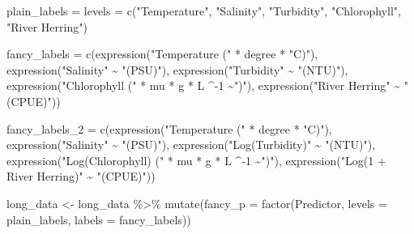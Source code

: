 \documentclass[
]{article}
\newenvironment{Shaded}{\begin{snugshade}}{\end{snugshade}}
\newcommand{\AttributeTok}[1]{\textcolor[rgb]{0.77,0.63,0.00}{#1}}
\newcommand{\DecValTok}[1]{\textcolor[rgb]{0.00,0.00,0.81}{#1}}
\newcommand{\FunctionTok}[1]{\textcolor[rgb]{0.00,0.00,0.00}{#1}}
\newcommand{\NormalTok}[1]{#1}
\newcommand{\OtherTok}[1]{\textcolor[rgb]{0.56,0.35,0.01}{#1}}
\newcommand{\SpecialCharTok}[1]{\textcolor[rgb]{0.00,0.00,0.00}{#1}}
\newcommand{\StringTok}[1]{\textcolor[rgb]{0.31,0.60,0.02}{#1}}
\begin{document}
\begin{Shaded}
\begin{Highlighting}[]
\NormalTok{plain\_labels }\OtherTok{=}\NormalTok{ levels }\OtherTok{=} \FunctionTok{c}\NormalTok{(}\StringTok{"Temperature"}\NormalTok{,}
                          \StringTok{"Salinity"}\NormalTok{, }
                          \StringTok{"Turbidity"}\NormalTok{,}
                          \StringTok{"Chlorophyll"}\NormalTok{, }
                          \StringTok{"River Herring"}\NormalTok{)}

\NormalTok{fancy\_labels }\OtherTok{=}  \FunctionTok{c}\NormalTok{(}\FunctionTok{expression}\NormalTok{(}\StringTok{"Temperature ("} \SpecialCharTok{*}\NormalTok{ degree }\SpecialCharTok{*} \StringTok{"C)"}\NormalTok{),}
                  \FunctionTok{expression}\NormalTok{(}\StringTok{"Salinity"} \SpecialCharTok{\textasciitilde{}} \StringTok{"(PSU)"}\NormalTok{),}
                  \FunctionTok{expression}\NormalTok{(}\StringTok{"Turbidity"} \SpecialCharTok{\textasciitilde{}} \StringTok{"(NTU)"}\NormalTok{),}
                  \FunctionTok{expression}\NormalTok{(}\StringTok{"Chlorophyll ("} \SpecialCharTok{*}\NormalTok{ mu }\SpecialCharTok{*}\NormalTok{ g }\SpecialCharTok{*}\NormalTok{ L }\SpecialCharTok{\^{}{-}}\DecValTok{1} \SpecialCharTok{\textasciitilde{}}\StringTok{")"}\NormalTok{), }
                  \FunctionTok{expression}\NormalTok{(}\StringTok{"River Herring"} \SpecialCharTok{\textasciitilde{}}  \StringTok{"(CPUE)"}\NormalTok{))}

\NormalTok{fancy\_labels\_2 }\OtherTok{=}  \FunctionTok{c}\NormalTok{(}\FunctionTok{expression}\NormalTok{(}\StringTok{"Temperature ("} \SpecialCharTok{*}\NormalTok{ degree }\SpecialCharTok{*} \StringTok{"C)"}\NormalTok{),}
                    \FunctionTok{expression}\NormalTok{(}\StringTok{"Salinity"} \SpecialCharTok{\textasciitilde{}} \StringTok{"(PSU)"}\NormalTok{),}
                    \FunctionTok{expression}\NormalTok{(}\StringTok{"Log(Turbidity)"} \SpecialCharTok{\textasciitilde{}} \StringTok{"(NTU)"}\NormalTok{),}
                    \FunctionTok{expression}\NormalTok{(}\StringTok{"Log(Chlorophyll) ("} \SpecialCharTok{*}\NormalTok{ mu }\SpecialCharTok{*}\NormalTok{ g }\SpecialCharTok{*}\NormalTok{ L }\SpecialCharTok{\^{}{-}}\DecValTok{1} \SpecialCharTok{\textasciitilde{}}\StringTok{")"}\NormalTok{), }
                    \FunctionTok{expression}\NormalTok{(}\StringTok{"Log(1 + River Herring)"} \SpecialCharTok{\textasciitilde{}}  \StringTok{"(CPUE)"}\NormalTok{))}

\NormalTok{long\_data }\OtherTok{\textless{}{-}}\NormalTok{ long\_data }\SpecialCharTok{\%\textgreater{}\%}
  \FunctionTok{mutate}\NormalTok{(}\AttributeTok{fancy\_p =} \FunctionTok{factor}\NormalTok{(Predictor, }\AttributeTok{levels =}\NormalTok{ plain\_labels, }
                        \AttributeTok{labels =}\NormalTok{ fancy\_labels))}
\end{Highlighting}
\end{Shaded}
\end{document}
